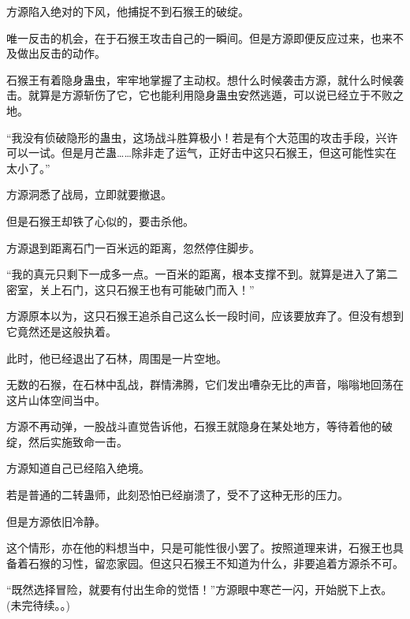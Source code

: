 \begin{this_body}
方源陷入绝对的下风，他捕捉不到石猴王的破绽。

唯一反击的机会，在于石猴王攻击自己的一瞬间。但是方源即便反应过来，也来不及做出反击的动作。

石猴王有着隐身蛊虫，牢牢地掌握了主动权。想什么时候袭击方源，就什么时候袭击。就算是方源斩伤了它，它也能利用隐身蛊虫安然逃遁，可以说已经立于不败之地。

“我没有侦破隐形的蛊虫，这场战斗胜算极小！若是有个大范围的攻击手段，兴许可以一试。但是月芒蛊……除非走了运气，正好击中这只石猴王，但这可能性实在太小了。”

方源洞悉了战局，立即就要撤退。

但是石猴王却铁了心似的，要击杀他。

方源退到距离石门一百米远的距离，忽然停住脚步。

“我的真元只剩下一成多一点。一百米的距离，根本支撑不到。就算是进入了第二密室，关上石门，这只石猴王也有可能破门而入！”

方源原本以为，这只石猴王追杀自己这么长一段时间，应该要放弃了。但没有想到它竟然还是这般执着。

此时，他已经退出了石林，周围是一片空地。

无数的石猴，在石林中乱战，群情沸腾，它们发出嘈杂无比的声音，嗡嗡地回荡在这片山体空间当中。

方源不再动弹，一股战斗直觉告诉他，石猴王就隐身在某处地方，等待着他的破绽，然后实施致命一击。

方源知道自己已经陷入绝境。

若是普通的二转蛊师，此刻恐怕已经崩溃了，受不了这种无形的压力。

但是方源依旧冷静。

这个情形，亦在他的料想当中，只是可能性很小罢了。按照道理来讲，石猴王也具备着石猴的习性，留恋家园。但这只石猴王不知道为什么，非要追着方源杀不可。

“既然选择冒险，就要有付出生命的觉悟！”方源眼中寒芒一闪，开始脱下上衣。(未完待续。。)

\end{this_body}

